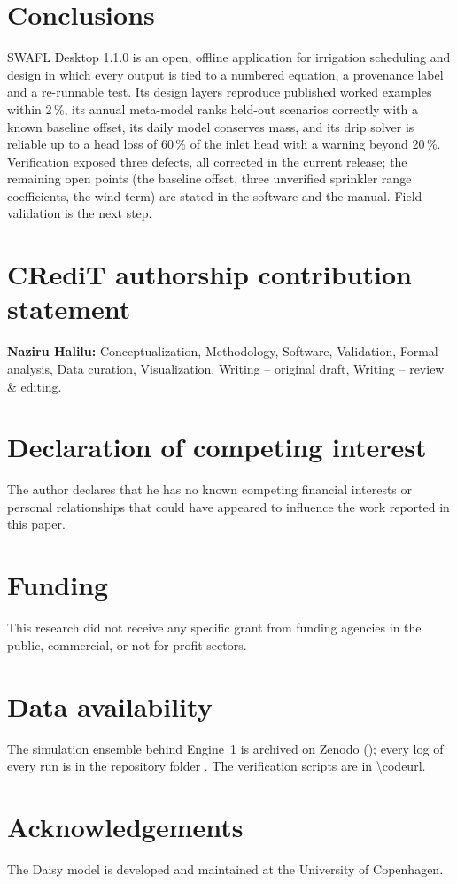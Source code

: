 \documentclass[preprint,12pt]{elsarticle}
\begin{document}
\section{Conclusions}
SWAFL Desktop 1.1.0 is an open, offline application for irrigation scheduling and design in which every output is tied to a numbered equation, a provenance label and a re-runnable test. Its design layers reproduce published worked examples within 2\,\%, its annual meta-model ranks held-out scenarios correctly with a known baseline offset, its daily model conserves mass, and its drip solver is reliable up to a head loss of 60\,\% of the inlet head with a warning beyond 20\,\%. Verification exposed three defects, all corrected in the current release; the remaining open points (the baseline offset, three unverified sprinkler range coefficients, the wind term) are stated in the software and the manual. Field validation is the next step.

\section*{CRediT authorship contribution statement}
\textbf{Naziru Halilu:} Conceptualization, Methodology, Software, Validation, Formal analysis, Data curation, Visualization, Writing -- original draft, Writing -- review \& editing.

\section*{Declaration of competing interest}
The author declares that he has no known competing financial interests or personal relationships that could have appeared to influence the work reported in this paper.

\section*{Funding}
This research did not receive any specific grant from funding agencies in the public, commercial, or not-for-profit sectors.

\section*{Data availability}
The simulation ensemble behind Engine~1 is archived on Zenodo (); every log of every run is in the repository folder \cslink{}. The verification scripts are in \url{\codeurl}.

\section*{Acknowledgements}
The Daisy model is developed and maintained at the University of Copenhagen.



\end{document}
